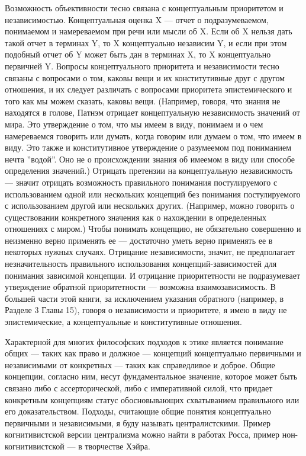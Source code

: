 \documentclass[11pt]{book}
\begin{document}
Возможность объективности тесно связана с концептуальным приоритетом и независимостью. Концептуальная оценка X --- отчет о подразумеваемом, понимаемом и намереваемом при речи или мысли об X. Если об X нельзя дать такой отчет в терминах Y, то X концептуально независим Y, и если при этом подобный отчет об Y может быть дан в терминах X, то X концептуально первичней Y. Вопросы концептуального приоритета и независимости тесно связаны с вопросами о том, каковы вещи и их конститутивные друг с другом отношения, и их следует различать с вопросами приоритета эпистемического и того как мы можем сказать, каковы вещи. (Например, говоря, что знания не находятся в голове, Патнэм отрицает концептуальную независимость значений от мира. Это утверждение о том, что мы имеем в виду, понимаем и о чем намереваемся говорить или думать, когда говорим или думаем о том, что имеем в виду. Это также и конститутивное утверждение о разумеемом под пониманием нечта ''водой''. Оно не о происхождении знания об имеемом в виду или способе определения значений.) Отрицать претензии на концептуальную независимость --- значит отрицать возможность правильного понимания постулируемого с использованием одной или нескольких концепций без понимания постулируемого с использованием другой или нескольких других. (Например, можно говорить о существовании конкретного значения как о нахождении в определенных отношениях с миром.) Чтобы понимать концепцию, не обязательно совершенно и неизменно верно применять ее --- достаточно уметь верно применять ее в некоторых нужных случаях. Отрицание независимости, значит, не предполагает незначительность правильного использования концепций-зависимостей для понимания зависимой концепции. И отрицание приоритетности не подразумевает утверждение обратной приоритетности --- возможна взаимозависимость. В большей части этой книги, за исключением указания обратного (например, в Разделе 3 Главы 15), говоря о независимости и приоритете, я имею в виду не эпистемические, а концептуальные и конститутивные отношения.

Характерной для многих философских подходов к этике является понимание общих --- таких как право и должное --- концепций концептуально первичными и независимыми от конкретных --- таких как справедливое и доброе. Общие концепции, согласно ним, несут фундаментальное значение, которое может быть связано либо с ассерторической, либо с императивной силой, что придает конкретным концепциям статус обосновывающих схватыванием правильного или его доказательством. Подходы, считающие общие понятия концептуально первичными и независимыми, я буду называть централистскими. Пример когнитивистской версии централизма можно найти в работах Росса, пример нон-когнитивистской --- в творчестве Хэйра.
\end{document}
